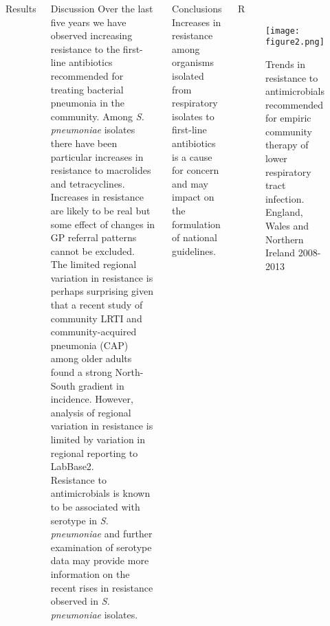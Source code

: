 \documentclass[final, 14pt]{beamer}
\begin{document}
\begin{frame}
\begin{columns}[t]
\begin{minipage}[t]{.95\textwidth}
\begin{block}{Results}
   \end{block}
   \vfill
  \begin{block}{Discussion}
  Over the last five years we have observed increasing resistance to the first-line antibiotics recommended for treating bacterial pneumonia in the community.
Among \textit{S. pneumoniae} isolates there have been particular increases in resistance to macrolides and tetracyclines. 
Increases in resistance are likely to be real but some effect of changes in GP referral patterns cannot be excluded. \\
The limited regional variation in resistance is perhaps surprising given that a recent study of community LRTI and community-acquired pneumonia (CAP) among older adults found a strong North-South gradient in incidence. \citep{Millett2013}
However, analysis of regional variation in resistance is limited by variation in regional reporting to LabBase2. \\
Resistance to antimicrobials is known to be associated with serotype in \textit{S. pneumoniae} and further examination of serotype data may provide more information on the recent rises in resistance observed in \textit{S. pneumoniae} isolates.
   \vspace{1 cm}

\end{block}
     \vfill
\begin{block}{Conclusions}
  Increases in resistance among organisms isolated from respiratory isolates to first-line antibiotics is a cause for concern and may impact on the formulation of national guidelines.  
        \vspace{1 cm}
\end{block}
     \vfill

\end{minipage}
    
 \begin{minipage}[t]{.95\textwidth} %
  \begin{block}{\textcolor{comp_blue}{R}}
   \begin{figure}
  \texttt{[image: figure2.png]}
  \caption{Trends in resistance to antimicrobials recommended for empiric community therapy of lower respiratory tract infection. England, Wales and Northern Ireland 2008-2013}
  \label{fig:fig2} 
  \end{figure} 


\end{block}
\end{minipage}
\end{columns}
\end{frame}
\end{document}

